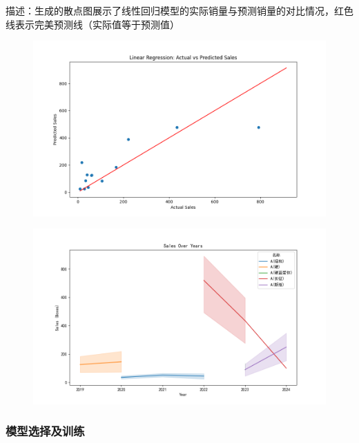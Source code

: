\documentclass[a4paper]{article}
\begin{document}
描述：生成的散点图展示了线性回归模型的实际销量与预测销量的对比情况，红色线表示完美预测线（实际值等于预测值）

\begin{figure}[H]
	\centering
	\includegraphics[width=1.0\textwidth]{img/Figure_6.png}
\end{figure}



\setlength{\extrarowheight}{4pt}



\begin{figure}[H]
	\centering
	\includegraphics[width=1.0\textwidth]{img/Figure_4.png}
\end{figure}


\setlength{\extrarowheight}{4pt}


\subsubsection{模型选择及训练}
\end{document}
